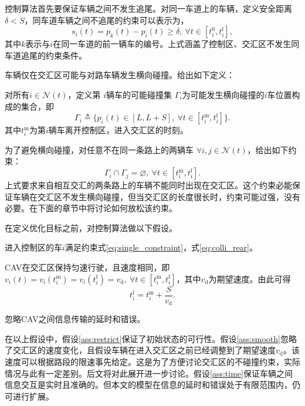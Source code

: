 控制算法首先要保证车辆之间不发生追尾。对同一车道上的车辆，定义安全距离$\delta < S$，同车道车辆之间不追尾的约束可以表示为，
\begin{equation}
s_i(t)=p_k(t)-p_i(t)\geq \delta, \ \forall t\in [t_i^0, t_i^\mathrm{f}],
\label{eq:colli_rear}
\end{equation}
其中$k$表示与$i$在同一车道的前一辆车的编号。上式涵盖了控制区、交汇区不发生同车道追尾的约束条件。

车辆仅在交汇区可能与对路车辆发生横向碰撞。给出如下定义：
\begin{definition}[可能碰撞集]
对所有$i\in \mathcal{N}(t)$，定义第 $i$辆车的{\heiti 可能碰撞集} $\Gamma_i$为可能发生横向碰撞的$i$车位置构成的集合，即
\begin{equation}
\Gamma_i\triangleq \{p_i(t)\in[L,L+S],\  \forall t\in [t_i^\mathrm{m},t_i^\mathrm{f}]\}.
\end{equation}
其中$t_i^\mathrm{m}$为第$i$辆车离开控制区，进入交汇区的时刻。
\end{definition}
为了避免横向碰撞，对任意不在同一条路上的两辆车 $\forall i,j\in \mathcal{N}(t)$，给出如下约束：
\begin{equation}
\Gamma_i\cap \Gamma_j=\varnothing, \ \forall t\in [t_i^\mathrm{m},t_i^\mathrm{f}].
\label{eq:colli_lateral}
\end{equation}
上式要求来自相互交汇的两条路上的车辆不能同时出现在交汇区。这个约束必能保证车辆在交汇区不发生横向碰撞，但当交汇区的长度很长时，约束可能过强，没有必要。在下面的章节中将讨论如何放松该约束。

在定义优化目标之前，对控制算法做以下假设。
\begin{assumption}
进入控制区的车$i$满足约束式\eqref{eq:single_constraint}，式\eqref{eq:colli_rear}。
\label{ass:restrict}
\end{assumption}
\begin{assumption}
CAV在交汇区保持匀速行驶，且速度相同，即$v_i(t) = v_i(t_i^\mathrm{m}) = v_i(t_i^\mathrm{f}) = v_\mathrm{d}, \ \forall t\in [t_i^\mathrm{m},t_i^\mathrm{f}]$，其中$v_\mathrm{d}$为期望速度。由此可得
\begin{equation}
t_i^\mathrm{f}=t_i^\mathrm{m} + \frac{S}{v_\mathrm{d}}.
\end{equation}
\label{ass:smooth}
\end{assumption}
\begin{assumption}
忽略CAV之间信息传输的延时和错误。
\label{ass:time}
\end{assumption}

在以上假设中，假设\ref{ass:restrict}保证了初始状态的可行性。假设\ref{ass:smooth}忽略了交汇区的速度变化，且假设车辆在进入交汇区之前已经调整到了期望速度$v_\mathrm{d}$。该速度可以根据路段的限速事先给定。这是为了方便讨论交汇区的不碰撞约束，实际情况与此有一定差别。后文将对此展开进一步讨论。假设\ref{ass:time}保证车辆之间信息交互是实时且准确的。但本文的模型在信息的延时和错误处于有限范围内，仍可进行扩展。

